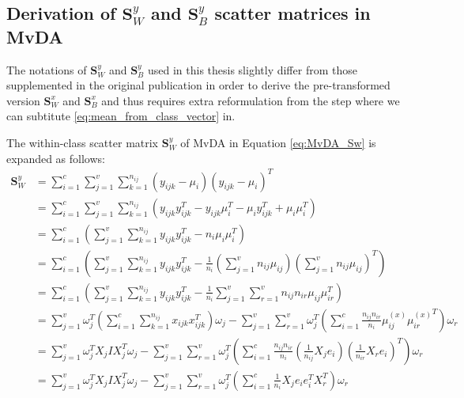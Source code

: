 \begin{appendix}
\subsection{Derivation of \texorpdfstring{$\boldsymbol{S}^y_W$}{intra-class} and \texorpdfstring{$\boldsymbol{S}^y_B$}{inter-class} scatter matrices in MvDA} \label{subsec:derivation_mvda}
    The notations of $\boldsymbol{S}^y_W$ and $\boldsymbol{S}^y_B$ used in this thesis slightly differ from those supplemented in the original publication \cite{kan2015multi} in order to derive the pre-transformed version $\boldsymbol{S}^x_W$ and $\boldsymbol{S}^x_B$ and thus requires extra reformulation from the step where we can subtitute \eqref{eq:mean_from_class_vector} in.

    The within-class scatter matrix $\boldsymbol{S}^y_W$ of MvDA in Equation \eqref{eq:MvDA_Sw} is expanded as follows:
    \begin{equation}
        \begin{split}
            \boldsymbol{S}^y_W &= \sum_{i=1}^{c}\sum_{j=1}^{v}\sum_{k=1}^{n_{ij}}(y_{ijk}-\mu_i)(y_{ijk}-\mu_i)^T \\
            &= \sum_{i=1}^{c}\sum_{j=1}^{v}\sum_{k=1}^{n_{ij}}\left(y_{ijk}y_{ijk}^T - y_{ijk}\mu_i^T - \mu_iy_{ijk}^T + \mu_i\mu_i^T\right) \\
            &= \sum_{i=1}^{c}\left(\sum_{j=1}^{v}\sum_{k=1}^{n_{ij}}y_{ijk}y_{ijk}^T - n_i\mu_i\mu_i^T\right) \\
            &= \sum_{i=1}^{c}\left(\sum_{j=1}^{v}\sum_{k=1}^{n_{ij}}y_{ijk}y_{ijk}^T - \frac{1}{n_i}\left(\sum_{j=1}^{v}n_{ij}\mu_{ij}\right){\left(\sum_{j=1}^{v}n_{ij}\mu_{ij}\right)}^T\right) \\
            &= \sum_{i=1}^{c}\left(\sum_{j=1}^{v}\sum_{k=1}^{n_{ij}}y_{ijk}y_{ijk}^T - \frac{1}{n_i}\sum_{j=1}^{v}\sum_{r=1}^{v}n_{ij}n_{ir}\mu_{ij}\mu_{ir}^T\right) \\
            &= \sum_{j=1}^{v}\omega_j^T\left(\sum_{i=1}^{c}\sum_{k=1}^{n_{ij}}x_{ijk}x_{ijk}^T\right)\omega_j - \sum_{j=1}^{v}\sum_{r=1}^{v}\omega_j^T\left(\sum_{i=1}^{c}\frac{n_{ij}n_{ir}}{n_i}\mu^{(x)}_{ij}{\mu^{(x)}_{ir}}^T\right)\omega_r \\
            &= \sum_{j=1}^{v}\omega_j^T X_j I X_j^T\omega_j - \sum_{j=1}^{v}\sum_{r=1}^{v}\omega_j^T\left(\sum_{i=1}^{c}\frac{n_{ij}n_{ir}}{n_i}\left(\frac{1}{n_{ij}}X_j e_i\right)\left(\frac{1}{n_{ir}}X_r e_i\right)^T\right)\omega_r \\
            &= \sum_{j=1}^{v}\omega_j^T X_j I X_j^T\omega_j - \sum_{j=1}^{v}\sum_{r=1}^{v}\omega_j^T\left(\sum_{i=1}^{c}\frac{1}{n_i}X_j e_i e_i^T X_r^T\right)\omega_r \\

\end{split}
\end{equation}
\end{appendix}
